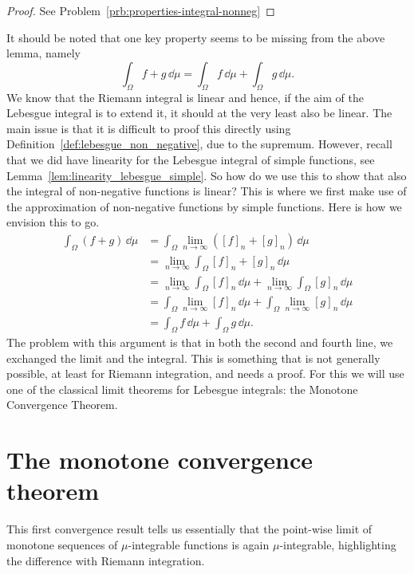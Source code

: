 \begin{proof}
See Problem~\ref{prb:properties-integral-nonneg}
\end{proof}

It should be noted that one key property seems to be missing from the above lemma, namely
\[
	\int_\Omega f + g \, \dd \mu = \int_\Omega f\, \dd \mu + \int_\Omega g\, \dd \mu.
\]
We know that the Riemann integral is linear and hence, if the aim of the Lebesgue integral is to extend it, it should at the very least also be linear. The main issue is that it is difficult to proof this directly using Definition~\ref{def:lebesgue_non_negative}, due to the supremum. However, recall that we did have linearity for the Lebesgue integral of simple functions, see Lemma~\ref{lem:linearity_lebesgue_simple}. So how do we use this to show that also the integral of non-negative functions is linear? This is where we first make use of the approximation of non-negative functions by simple functions. Here is how we envision this to go.
\begin{align*}
	\int_\Omega (f+g) \, \dd \mu &= \int_\Omega \lim_{n \to \infty} ([f]_n + [g]_n) \, \dd \mu \\
	&= \lim_{n \to \infty} \int_\Omega [f]_n + [g]_n \, \dd \mu \\
	&= \lim_{n \to \infty} \int_\Omega [f]_n \, \dd \mu + \lim_{n \to \infty} \int_\Omega [g]_n \, \dd \mu \\
	&= \int_\Omega \lim_{n \to \infty} [f]_n \, \dd \mu + \int_\Omega \lim_{n \to \infty} [g]_n \, \dd \mu \\
	&= \int_\Omega f \, \dd \mu + \int_\Omega g \, \dd \mu.
\end{align*}
The problem with this argument is that in both the second and fourth line, we exchanged the limit and the integral. This is something that is not generally possible, at least for Riemann integration, and needs a proof. For this we will use one of the classical limit theorems for Lebesgue integrals: the Monotone Convergence Theorem.

\section{The monotone convergence theorem}
\label{sec:monotone_convergence}

This first convergence result tells us essentially that the point-wise limit of monotone sequences of $\mu$-integrable functions is again $\mu$-integrable, highlighting the difference with Riemann integration.

